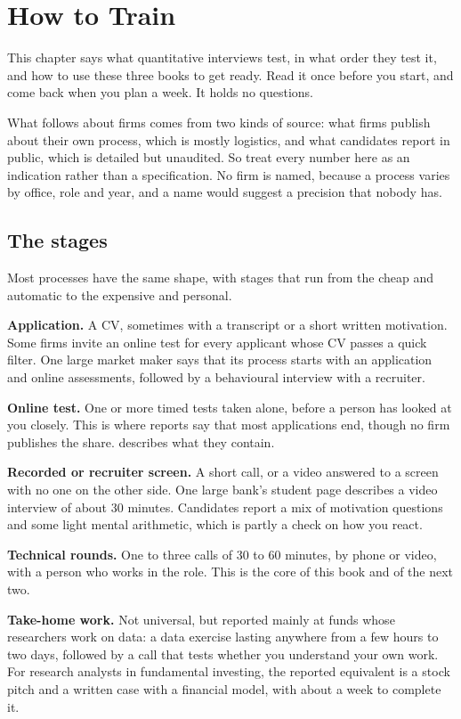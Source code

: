\chapter{How to Train}\label{ch:iv1:how-to-train}

This chapter says what quantitative interviews test, in what order they test it, and how to use these three books to get ready. Read it once before you start, and come back when you plan a week. It holds no questions.

What follows about firms comes from two kinds of source: what firms publish about their own process, which is mostly logistics, and what candidates report in public, which is detailed but unaudited. So treat every number here as an indication rather than a specification. No firm is named, because a process varies by office, role and year, and a name would suggest a precision that nobody has.

\section{The stages}

Most processes have the same shape, with stages that run from the cheap and automatic to the expensive and personal.

\textbf{Application.} A CV, sometimes with a transcript or a short written motivation. Some firms invite an online test for every applicant whose CV passes a quick filter. One large market maker says that its process starts with an application and online assessments, followed by a behavioural interview with a recruiter.

\textbf{Online test.} One or more timed tests taken alone, before a person has looked at you closely. This is where reports say that most applications end, though no firm publishes the share.  describes what they contain.

\textbf{Recorded or recruiter screen.} A short call, or a video answered to a screen with no one on the other side. One large bank's student page describes a video interview of about 30 minutes. Candidates report a mix of motivation questions and some light mental arithmetic, which is partly a check on how you react.

\textbf{Technical rounds.} One to three calls of 30 to 60 minutes, by phone or video, with a person who works in the role. This is the core of this book and of the next two.

\textbf{Take-home work.} Not universal, but reported mainly at funds whose researchers work on data: a data exercise lasting anywhere from a few hours to two days, followed by a call that tests whether you understand your own work. For research analysts in fundamental investing, the reported equivalent is a stock pitch and a written case with a financial model, with about a week to complete it.

